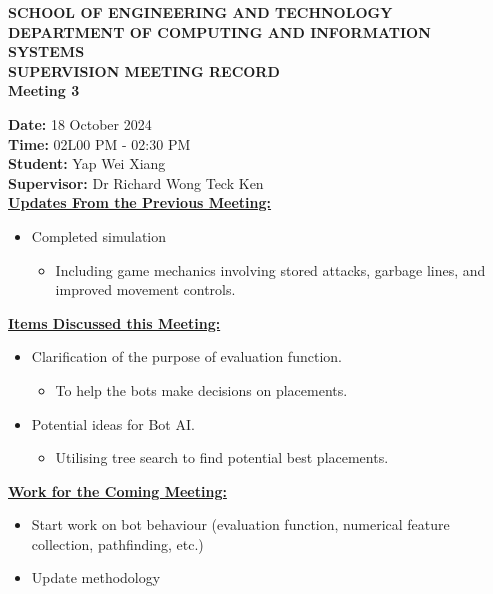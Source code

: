 \documentclass[a4paper, 12pt]{report}
\begin{document}
	
	\onehalfspacing
	
	\begin{center}
		
		\textbf{\large SCHOOL OF ENGINEERING AND TECHNOLOGY}	\\
		\textbf{\small DEPARTMENT OF COMPUTING AND INFORMATION SYSTEMS} \\
		\vspace{1cm}
		\textbf{\LARGE SUPERVISION MEETING RECORD}\\
		\textbf{\normalsize Meeting 3}	%
		
	\end{center}
	
	\noindent			%
	\textbf{Date: } 18 October 2024 \\	%
	\textbf{Time: } 02L00 PM - 02:30 PM \\	%
	\textbf{Student: } Yap Wei Xiang \\
	\textbf{Supervisor: } Dr Richard Wong Teck Ken \\
	
	\noindent			%
	\textbf{\underline{Updates From the Previous Meeting: }}
	\begin{itemize}	%
		\item Completed simulation
		\begin{itemize}
			\item Including game mechanics involving stored attacks, garbage lines, and improved movement controls.
		\end{itemize}
	\end{itemize}
	
	\noindent			%
	\textbf{\underline{Items Discussed this Meeting: }}
	\begin{itemize}	%
		\item Clarification of the purpose of evaluation function.
		\begin{itemize}
			\item To help the bots make decisions on placements.
		\end{itemize}
		\item Potential ideas for Bot AI.
		\begin{itemize}
			\item Utilising tree search to find potential best placements.
		\end{itemize}
	\end{itemize}
	
	\noindent			%
	\textbf{\underline{Work for the Coming Meeting: }}
	\begin{itemize}	%
		\item Start work on bot behaviour (evaluation function, numerical feature collection, pathfinding, etc.)
		\item Update methodology
	\end{itemize}
	
\end{document}
